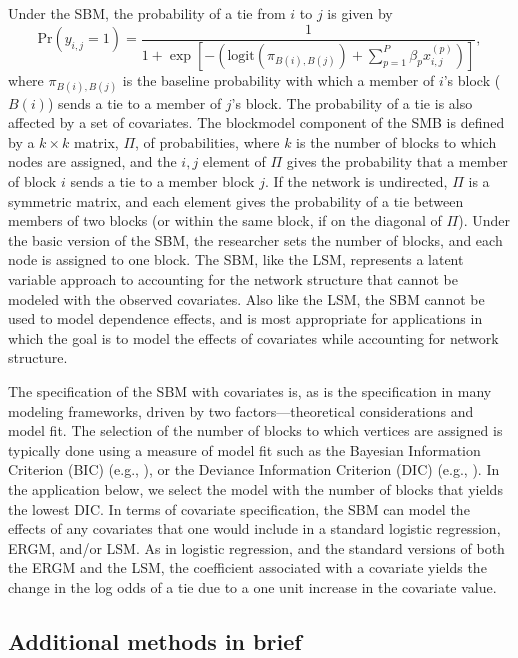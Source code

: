 \documentclass[fleqn,12pt]{wlscirep}
\begin{document}
Under the SBM, the probability of a tie from $i$ to $j$ is given by $$\text{Pr}(y_{i,j} = 1) = \frac{1}{1+\exp \left[ -\left(  \text{logit}\left( \pi_{B(i),B(j)}\right) +  \sum_{p = 1}^P \beta_p x_{i,j}^{(p)}   \right)\right]}, $$ where $\pi_{B(i),B(j)}$ is the baseline probability with which a member of $i$'s block ($B(i)$) sends a tie to a member of $j$'s block. The probability of a tie is also affected by a set of covariates. The blockmodel component of the SMB is defined by a $k \times k$ matrix, $\Pi$, of probabilities, where $k$ is the number of blocks to which nodes are assigned, and the $i,j$ element of $\Pi$ gives the probability that a member of block $i$ sends a tie to a member block $j$. If the network is undirected, $\Pi$ is a symmetric matrix, and each element gives the probability of a tie between members of two blocks (or within the same block, if on the diagonal of $\Pi$). Under the basic version of the SBM, the researcher sets the number of blocks, and each node is assigned to one block. The SBM, like the LSM, represents a latent variable approach to accounting for the network structure that cannot be modeled with the observed covariates. Also like the LSM, the SBM cannot be used to model dependence effects, and is most appropriate for applications in which the goal is to model the effects of covariates while accounting for network structure.

The specification of the SBM with covariates is, as is the specification in many modeling frameworks, driven by two factors---theoretical considerations and model fit. The selection of the number of blocks to which vertices are assigned is typically done using a measure of model fit such as the Bayesian Information Criterion (BIC) (e.g., \citet{robinson2015dynamic}), or the Deviance Information Criterion (DIC) (e.g., \citep{sohn2017bayesian}). In the application below, we select the model with the number of blocks that yields the lowest DIC. In terms of covariate specification, the SBM can model the effects of any covariates that one would include in a standard logistic regression, ERGM, and/or LSM. As in logistic regression, and the standard versions of both the ERGM and the LSM, the coefficient associated with a covariate yields the change in the log odds of a tie due to a one unit increase in the covariate value. 

\subsection{Additional methods in brief}
\end{document}
